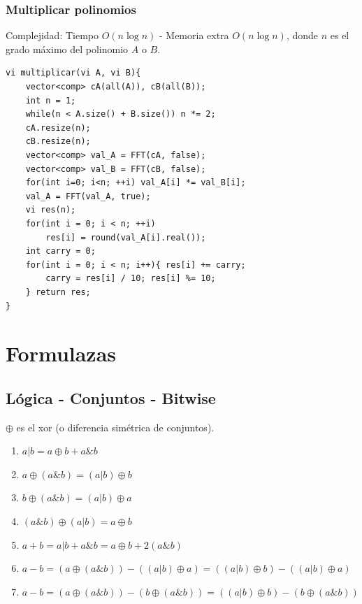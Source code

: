 \documentclass[12 pts,spanish,mexico]{article}
\numberwithin{equation}{section}
\begin{document}
\begin{multicols}{2}
\subsubsection{Multiplicar polinomios}
Complejidad: Tiempo $O(n\log n)$ - Memoria extra $O(n\log n)$, donde $n$ es el grado máximo del polinomio $A$ o $B$.
\begin{verbatim}
vi multiplicar(vi A, vi B){
    vector<comp> cA(all(A)), cB(all(B));
    int n = 1;
    while(n < A.size() + B.size()) n *= 2;
    cA.resize(n);
    cB.resize(n);
    vector<comp> val_A = FFT(cA, false);
    vector<comp> val_B = FFT(cB, false);
    for(int i=0; i<n; ++i) val_A[i] *= val_B[i];
    val_A = FFT(val_A, true);
    vi res(n);
    for(int i = 0; i < n; ++i)
        res[i] = round(val_A[i].real());
    int carry = 0;
    for(int i = 0; i < n; i++){ res[i] += carry;
        carry = res[i] / 10; res[i] %= 10;
    } return res;
}
\end{verbatim}


\section{Formulazas}

\subsection{Lógica - Conjuntos - Bitwise}
$\oplus$ es el xor (o diferencia simétrica de conjuntos).
\begin{enumerate}[1.]
    \item $a|b = a\oplus b + a \& b$
    \item $a\oplus (a\&b) = (a|b)\oplus b$
    \item $b\oplus (a\&b) = (a|b)\oplus a$
    \item $(a\&b)\oplus (a|b) = a\oplus b$
    \item $a + b = a|b + a\&b = a\oplus b + 2(a\&b)$
    \item $a - b = (a\oplus (a\&b))-((a|b)\oplus a) = ((a|b)\oplus b)-((a|b)\oplus a)$
    \item $a - b = (a\oplus (a\&b))-(b\oplus (a\&b)) = ((a|b)\oplus b)-(b\oplus (a\&b))$
\end{enumerate}


\end{multicols}
\end{document}
